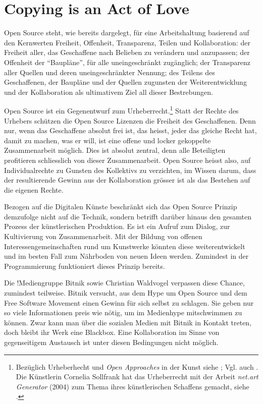 \documentclass[
paper=164mm:234mm, %
pagesize, %
DIV=calc, %
10pt, %
BCOR=0mm, %
parskip=half- %
]{scrbook}
\begin{document}
{}
\chapter*{Copying is an Act of Love}

Open Source steht, wie bereits dargelegt, für eine Arbeitshaltung basierend auf den Kernwerten Freiheit, Offenheit, Transparenz, Teilen und Kollaboration: der Freiheit aller, das Geschaffene nach Belieben zu verändern und anzupassen; der Offenheit der \enquote{Baupläne}, für alle uneingeschränkt zugänglich; der Transparenz aller Quellen und deren uneingeschränkter Nennung; des Teilens des Geschaffenen, der Baupläne und der Quellen zugunsten der Weiterentwicklung und der Kollaboration als ultimativem Ziel all dieser Bestrebungen.

Open Source ist ein Gegenentwurf zum Urheberrecht.\footnote{Bezüglich Urheberhecht und \emph{Open Approaches} in der Kunst siehe \cite{Senn:2007}; Vgl. auch \cite{Stalder:2010}. Die Künstlerin Cornelia Sollfrank hat das Urheberrecht mit der Arbeit \emph{net.art Generator} (2004) zum Thema ihres künstlerischen Schaffens gemacht, siehe \cite{Sollfrank:2004}.} Statt der Rechte des Urhebers schützen die Open Source Lizenzen die Freiheit des Geschaffenen. Denn nur, wenn das Geschaffene absolut frei ist, das heisst, jeder das gleiche Recht hat, damit zu machen, was er will, ist eine offene und locker gekoppelte Zusammenarbeit möglich. Dies ist absolut zentral, denn alle Beteiligten profitieren schliesslich von dieser Zusammenarbeit. Open Source heisst also, auf Individualrechte zu Gunsten des Kollektivs zu verzichten, im Wissen darum, dass der resultierende Gewinn aus der Kollaboration grösser ist als das Bestehen auf die eigenen Rechte.

Bezogen auf die Digitalen Künste beschränkt sich das Open Source Prinzip demzufolge nicht auf die Technik, sondern betrifft darüber hinaus den gesamten Prozess der künstlerischen Produktion. Es ist ein Aufruf zum Dialog, zur Kultivierung von Zusammenarbeit. Mit der Bildung von offenen Interessengemeinschaften rund um Kunstwerke könnten diese weiterentwickelt und im besten Fall zum Nährboden von neuen Ideen werden. Zumindest in der Programmierung funktioniert dieses Prinzip bereits.

Die !Mediengruppe Bitnik sowie Christian Waldvogel verpassen diese Chance, zumindest teilweise. Bitnik versucht, aus dem Hype um Open Source und dem Free Software Movement einen Gewinn für sich selbst zu schlagen. Sie geben nur so viele Informationen preis wie nötig, um im Medienhype mitschwimmen zu können. Zwar kann man über die sozialen Medien mit Bitnik in Kontakt treten, doch bleibt ihr Werk eine Blackbox. Eine Kollaboration im Sinne von gegenseitigem Austausch ist unter diesen Bedingungen nicht möglich.
\end{document}
